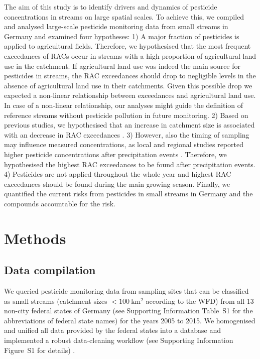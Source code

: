 \documentclass[journal=esthag,manuscript=article]{achemso}
\begin{document}
The aim of this study is to identify drivers and dynamics of pesticide concentrations in streams on large spatial scales.
To achieve this, we compiled and analysed large-scale pesticide monitoring data from small streams in Germany and examined four hypotheses:
1) A major fraction of pesticides is applied to agricultural fields.
Therefore, we hypothesised that the most frequent exceedances of RACs occur in streams with a high proportion of agricultural land use in the catchment. 
If agricultural land use was indeed the main source for pesticides in streams, the RAC exceedances should drop to negligible levels in the absence of agricultural land use in their catchments. 
Given this possible drop we expected a non-linear relationship between exceedances and agricultural land use.
In case of a non-linear relationship, our analyses might guide the definition of reference streams without pesticide pollution in future monitoring. 
2) Based on previous studies, we hypothesised that an increase in catchment size is associated with an decrease in RAC exceedances \citep{stehle_pesticide_2015,schulz_field_2004}. 
3) However, also the timing of sampling may influence measured concentrations,
as local and regional studies reported higher pesticide concentrations after precipitation events \citep{liess_determination_1999,Xing_Chow_Rees_Meng_Li_Ernst_Benoy_Zha_Hewitt_2013}. 
Therefore, we hypothesised the highest RAC exceedances to be found after precipitation events. 
4) Pesticides are not applied throughout the whole year and highest RAC exceedances should be found during the main growing season.
Finally, we quantified the current risks from pesticides in small streams in Germany and the compounds accountable for the risk. 



\section{Methods}
\subsection{Data compilation}
We queried pesticide monitoring data from sampling sites that can be classified as small streams (catchment sizes $\mathrm{< 100~km^2}$ according to the WFD) from all 13 non-city federal states of Germany (see Supporting Information Table~S1 for the abbreviations of federal state names) for the years 2005 to 2015.
We homogenised and unified all data provided by the federal states into a database and implemented a robust data-cleaning workflow (see Supporting Information Figure~S1 for details) \citep{poisot_best_2015}.
\end{document}
